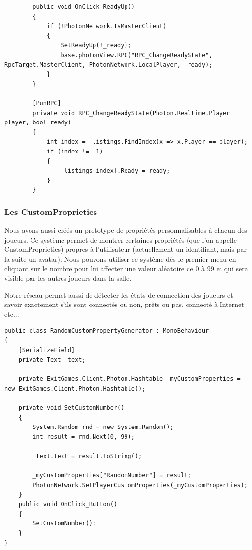 \documentclass{article}
\begin{document}
\newpage
\begin{lstlisting}
        public void OnClick_ReadyUp()
        {
            if (!PhotonNetwork.IsMasterClient)
            {
                SetReadyUp(!_ready);
                base.photonView.RPC("RPC_ChangeReadyState", RpcTarget.MasterClient, PhotonNetwork.LocalPlayer, _ready);
            }
        }
        
        [PunRPC]
        private void RPC_ChangeReadyState(Photon.Realtime.Player player, bool ready)
        {
            int index = _listings.FindIndex(x => x.Player == player);
            if (index != -1)
            {
                _listings[index].Ready = ready;
            }
        }
\end{lstlisting}

\subsubsection{Les CustomProprieties}

Nous avons aussi créés un prototype de propriétés personnalisables à chacun des joueurs. Ce système permet de montrer certaines propriétés (que l’on appelle CustomProprieties) propres à l'utilisateur (actuellement un identifiant, mais par la suite un avatar). Nous pouvons utiliser ce système dès le premier menu en cliquant sur le nombre pour lui affecter une valeur aléatoire de 0 à 99 et qui sera visible par les autres joueurs dans la salle.

Notre réseau permet aussi de détecter les états de connection des joueurs et savoir exactement s’ils sont connectés ou non, prêts ou pas, connecté à Internet etc...
\newpage
\begin{lstlisting}
public class RandomCustomPropertyGenerator : MonoBehaviour
{
    [SerializeField] 
    private Text _text;
    
    private ExitGames.Client.Photon.Hashtable _myCustomProperties = new ExitGames.Client.Photon.Hashtable();

    private void SetCustomNumber()
    {
        System.Random rnd = new System.Random();
        int result = rnd.Next(0, 99);

        _text.text = result.ToString();

        _myCustomProperties["RandomNumber"] = result;
        PhotonNetwork.SetPlayerCustomProperties(_myCustomProperties);
    }
    public void OnClick_Button()
    {
        SetCustomNumber();
    }
}
\end{lstlisting}
\end{document}
